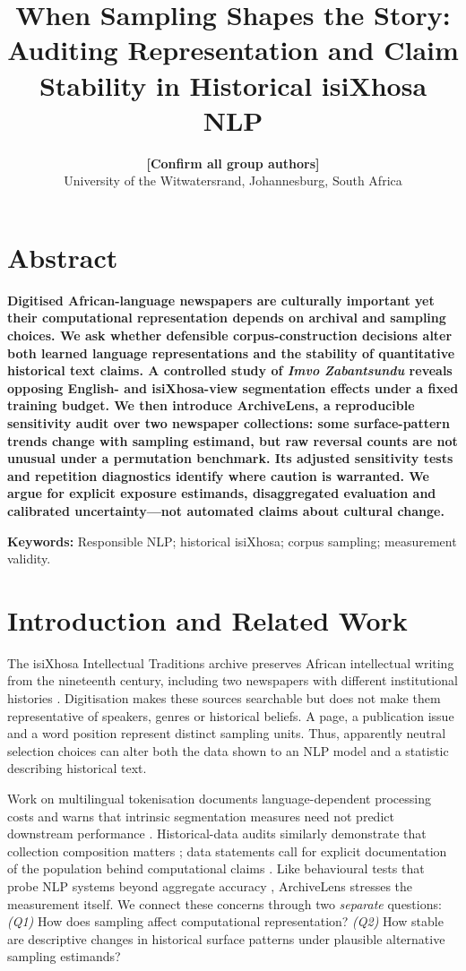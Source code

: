 \documentclass[10pt,letterpaper]{article}
\title{When Sampling Shapes the Story: Auditing Representation and Claim Stability in Historical isiXhosa NLP}
\author{{\large \bf [Confirm all group authors]}\\University of the Witwatersrand, Johannesburg, South Africa}
\date{}
\begin{document}
\maketitle
\vspace{-9pt}
\section{Abstract}
\noindent\textbf{\small
Digitised African-language newspapers are culturally important yet their computational representation depends on archival and sampling choices. We ask whether defensible corpus-construction decisions alter both learned language representations and the stability of quantitative historical text claims. A controlled study of \emph{Imvo Zabantsundu} reveals opposing English- and isiXhosa-view segmentation effects under a fixed training budget. We then introduce ArchiveLens, a reproducible sensitivity audit over two newspaper collections: some surface-pattern trends change with sampling estimand, but raw reversal counts are not unusual under a permutation benchmark. Its adjusted sensitivity tests and repetition diagnostics identify where caution is warranted. We argue for explicit exposure estimands, disaggregated evaluation and calibrated uncertainty---not automated claims about cultural change.}
\par\noindent\textbf{Keywords:} Responsible NLP; historical isiXhosa; corpus sampling; measurement validity.
\vspace{-4pt}
\section{Introduction and Related Work}
The isiXhosa Intellectual Traditions archive preserves African intellectual writing from the nineteenth century, including two newspapers with different institutional histories \citep{schoots2023archive}. Digitisation makes these sources searchable but does not make them representative of speakers, genres or historical beliefs. A page, a publication issue and a word position represent distinct sampling units. Thus, apparently neutral selection choices can alter both the data shown to an NLP model and a statistic describing historical text.

Work on multilingual tokenisation documents language-dependent processing costs \citep{petrov2023} and warns that intrinsic segmentation measures need not predict downstream performance \citep{ali2024}. Historical-data audits similarly demonstrate that collection composition matters \citep{beelen2025}; data statements call for explicit documentation of the population behind computational claims \citep{bender2018}. Like behavioural tests that probe NLP systems beyond aggregate accuracy \citep{ribeiro2020}, ArchiveLens stresses the measurement itself. We connect these concerns through two \emph{separate} questions: \emph{(Q1)} How does sampling affect computational representation? \emph{(Q2)} How stable are descriptive changes in historical surface patterns under plausible alternative sampling estimands?
\end{document}
